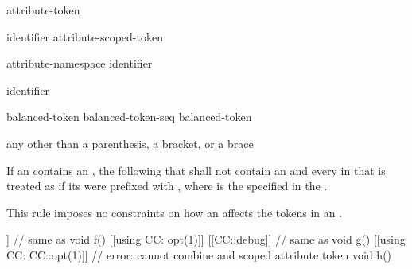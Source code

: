 \begin{bnf}
\br
    attribute-token 
\end{bnf}

\begin{bnf}
\br
    identifier\br
    attribute-scoped-token
\end{bnf}

\begin{bnf}
\br
    attribute-namespace \terminal{::} identifier
\end{bnf}

\begin{bnf}
\br
    identifier
\end{bnf}

\begin{bnf}
\br
    \terminal{(}  \terminal{)}
\end{bnf}

\begin{bnf}
\br
    balanced-token\br
    balanced-token-seq balanced-token
\end{bnf}

\begin{bnf}
\br
    \terminal{(}  \terminal{)}\br
    \terminal{[}  \terminal{]}\br
    \terminal{\{}  \terminal{\}}\br
    \textnormal{any  other than a parenthesis, a bracket, or a brace}
\end{bnf}

\pnum
If an 
contains an ,
the  following that 
shall not contain an 
and every  in that 
is treated as if
its  were prefixed with ,
where  is the 
specified in the .
\begin{note}
This rule imposes no constraints on how
an 
affects the tokens in an .
\end{note}
\begin{example}
\begin{codeblock}
[[using CC: opt(1), debug]]         // same as 
  void f() {}
[[using CC: opt(1)]] [[CC::debug]]  // same as \tcode{[[CC::opt(1)]] [[CC::debug]]}
  void g() {}
[[using CC: CC::opt(1)]]            // error: cannot combine  and scoped attribute token
  void h() {}
\end{codeblock}
\end{example}

